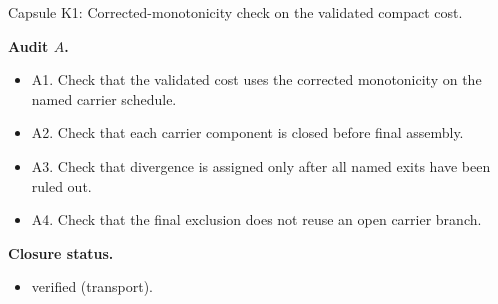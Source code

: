 \documentclass[11pt]{amsart}
\newcommand{\capsulefield}[1]{\par\smallskip\noindent\textbf{#1.}\ }
\begin{document}
\begin{proofcapsule}{Capsule K1: Corrected-monotonicity check on the validated compact cost.}
  \capsulefield{Audit \(A\)}
  \begin{itemize}[leftmargin=1.8em]
  \item A1. Check that the validated cost uses the corrected monotonicity on the named carrier schedule.
  \item A2. Check that each carrier component is closed before final assembly.
  \item A3. Check that divergence is assigned only after all named exits have been ruled out.
  \item A4. Check that the final exclusion does not reuse an open carrier branch.
  \end{itemize}
  \capsulefield{Closure status}
  \begin{itemize}[leftmargin=1.8em]
  \item verified (transport).
  \end{itemize}
\end{proofcapsule}
\end{document}
